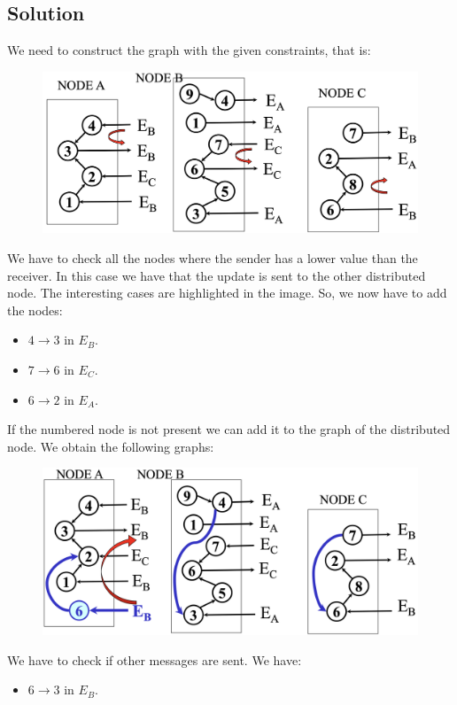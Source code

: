 \documentclass[12pt, a4paper]{report}
\newtheorem[style=M,bodystyle=\normalfont]{theorem}{Theorem}
\newtheorem[style=M,bodystyle=\normalfont]{corollary}{Corollary}
\newtheorem[style=M,bodystyle=\normalfont]{lemma}{Lemma}
\newtheorem[style=M,bodystyle=\normalfont]{definition}{Definition}
\begin{document}
    \subsection*{Solution}
        We need to construct the graph with the given constraints, that is: 
        \begin{figure}[H]
            \centering
            \includegraphics[width=0.75\linewidth]{images/Ob1.png}
        \end{figure}
        We have to check all the nodes where the sender has a lower value than the receiver. In this case we have that the update is sent to the 
        other distributed node. The interesting cases are highlighted in the image. So, we now have to add the nodes: 
        \begin{itemize}
            \item $4 \rightarrow 3$ in $E_B$. 
            \item $7 \rightarrow 6$ in $E_C$. 
            \item $6 \rightarrow 2$ in $E_A$. 
        \end{itemize}
        If the numbered node is not present we can add it to the graph of the distributed node. We obtain the following graphs: 
        \begin{figure}[H]
            \centering
            \includegraphics[width=0.75\linewidth]{images/Ob2.png}
        \end{figure}
        We have to check if other messages are sent. We have:
        \begin{itemize}
            \item $6 \rightarrow 3$ in $E_B$. 
        \end{itemize}
\end{document}
